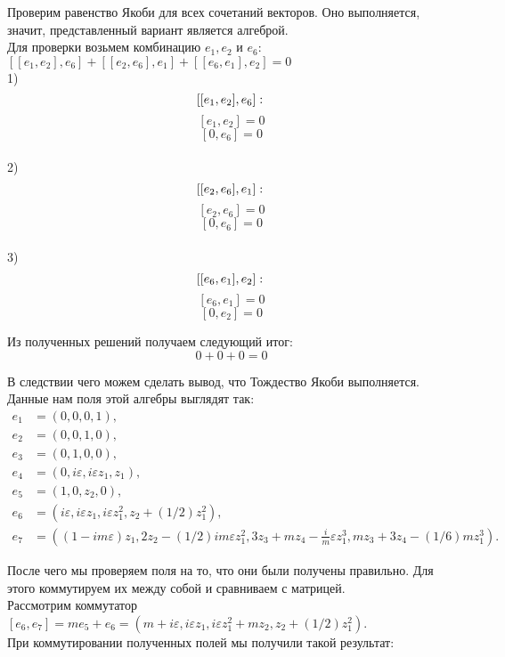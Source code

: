\documentclass[12pt]{article}
\begin{document}
Проверим равенство Якоби для всех сочетаний векторов. Оно выполняется, значит, представленный вариант является алгеброй. \\

Для проверки возьмем комбинацию \(e_1, e_2\) и \(e_6:\) \\

$[[e_1, e_2], e_6] + [[e_2, e_6], e_1] + [[e_6, e_1], e_2] = 0$ \\

1)
\[
 [[e_1, e_2], e_6]: \\
\]
\[
[e_1, e_2] = 0
\]
\[
[0, e_6] = 0 
\] \\

2)
\[
[[e_2, e_6], e_1]: \\
\]
\[
[e_2, e_6] = 0
\]
\[
[0, e_6] = 0 
\] \\

3) 
\[
[[e_6, e_1], e_2]: \\
\]
\[
[e_6, e_1] = 0 
\]
\[
[0, e_2] = 0 
\]

Из полученных решений получаем следующий итог:
\[
0 + 0 + 0 = 0
\]

В следствии чего можем сделать вывод, что Тождество Якоби выполняется. \\

Данные нам поля этой алгебры выглядят так:
\begin{align*}
e_1 &= (0,0,0,1), \\
e_2 &= (0,0,1,0), \\
e_3 &= (0,1,0,0),\\
e_4 &= (0, i \varepsilon, i \varepsilon z_1, z_1), \\
e_5 &= (1, 0, z_2, 0), \\
e_6 &= (i \varepsilon, i \varepsilon z_1, i \varepsilon z_1^2, z_2 + (1/2)z_1^2), \\
e_7 &= ((1 - i m \varepsilon) z_1, 2 z_2 - (1/2) i m \varepsilon z_1^2, 3 z_3 + m z_4 - \frac{i}{m} \varepsilon z_1^3, m z_3 + 3 z_4 - (1/6) m z_1^3). 
\end{align*} 

После чего мы проверяем поля на то, что они были получены правильно. Для этого коммутируем их между собой и сравниваем с матрицей. \\

Рассмотрим коммутатор $[e_6, e_7] = me_5 + e_6 = (m + i \varepsilon, i \varepsilon z_1, i \varepsilon z_1^2 + mz_2, z_2 + (1/2)z_1^2)$. \\

При коммутировании полученных полей мы получили такой результат: \\
\end{document}

